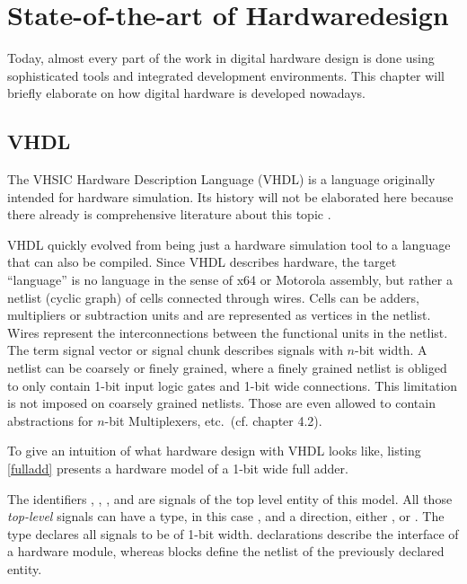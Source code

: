 
\chapter{State-of-the-art of Hardwaredesign}
\label{ch:StateOfTheArt}

Today, almost every part of the work in digital hardware design is done
using sophisticated tools and integrated development
environments. This chapter will briefly elaborate on how digital
hardware is developed nowadays.

\section{VHDL}
\label{sec:VHDL}


The VHSIC Hardware Description Language (VHDL) is a language
originally intended for hardware simulation. Its history will not be
elaborated here because there already is comprehensive literature
about this topic \cite{VHDLHIST}.

VHDL quickly evolved from being just a hardware simulation tool
to a language that can also be compiled. Since VHDL describes
hardware, the target ``language'' is no language in the sense of x64 or
Motorola assembly, but rather a netlist (cyclic graph) of
cells connected through wires. Cells can be adders,
multipliers or subtraction units and are represented as vertices in
the netlist. Wires represent the interconnections between the
functional units in the netlist. The term signal vector or signal
chunk describes signals with \(n\)-bit width. A netlist can be coarsely
or finely grained, where a finely grained netlist is obliged to only
contain 1-bit input logic gates and 1-bit wide connections. This
limitation is not imposed on coarsely grained netlists. Those are even
allowed to contain abstractions for \(n\)-bit Multiplexers, etc.\
(cf. \cite{YOSYSRM} chapter 4.2).

To give an intuition of what hardware design with VHDL looks
like, listing \ref{fulladd} presents a hardware model of a 1-bit wide
full adder.

The identifiers , , ,  and
 are signals
of the top level entity of this model. All those \emph{top-level}
signals can have a type, in this case , and a direction,
either \VH{in}, \VH{out} or \VH{inout}. The type \VH{std_logic}
declares all signals to be of 1-bit width.
 declarations describe the interface of a hardware
module, whereas  blocks define the netlist of the
previously declared entity.

